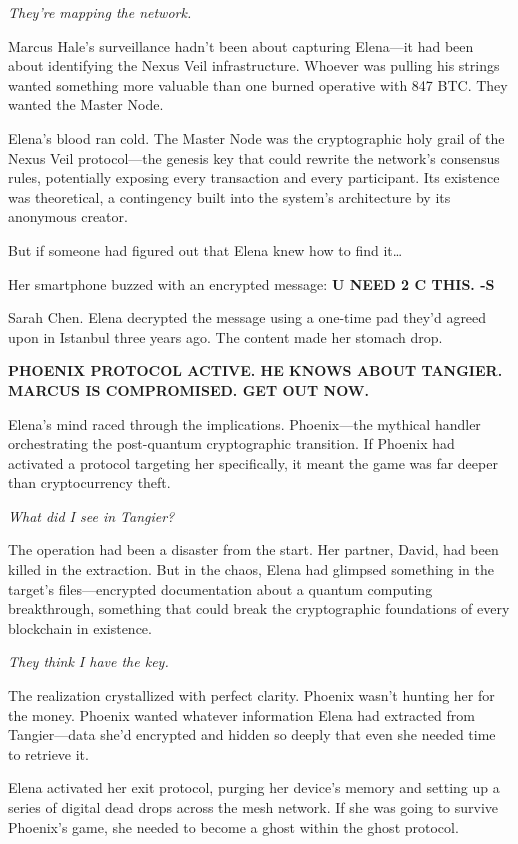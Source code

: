 \emph{They're mapping the network.}

Marcus Hale's surveillance hadn't been about capturing Elena---it had been about identifying the Nexus Veil infrastructure. Whoever was pulling his strings wanted something more valuable than one burned operative with 847 BTC. They wanted the Master Node.

Elena's blood ran cold. The Master Node was the cryptographic holy grail of the Nexus Veil protocol---the genesis key that could rewrite the network's consensus rules, potentially exposing every transaction and every participant. Its existence was theoretical, a contingency built into the system's architecture by its anonymous creator.

But if someone had figured out that Elena knew how to find it\ldots{}

Her smartphone buzzed with an encrypted message: \textbf{U NEED 2 C THIS. -S}

Sarah Chen. Elena decrypted the message using a one-time pad they'd agreed upon in Istanbul three years ago. The content made her stomach drop.

\textbf{PHOENIX PROTOCOL ACTIVE. HE KNOWS ABOUT TANGIER. MARCUS IS COMPROMISED. GET OUT NOW.}

Elena's mind raced through the implications. Phoenix---the mythical handler orchestrating the post-quantum cryptographic transition. If Phoenix had activated a protocol targeting her specifically, it meant the game was far deeper than cryptocurrency theft.

\emph{What did I see in Tangier?}

The operation had been a disaster from the start. Her partner, David, had been killed in the extraction. But in the chaos, Elena had glimpsed something in the target's files---encrypted documentation about a quantum computing breakthrough, something that could break the cryptographic foundations of every blockchain in existence.

\emph{They think I have the key.}

The realization crystallized with perfect clarity. Phoenix wasn't hunting her for the money. Phoenix wanted whatever information Elena had extracted from Tangier---data she'd encrypted and hidden so deeply that even she needed time to retrieve it.

Elena activated her exit protocol, purging her device's memory and setting up a series of digital dead drops across the mesh network. If she was going to survive Phoenix's game, she needed to become a ghost within the ghost protocol.

